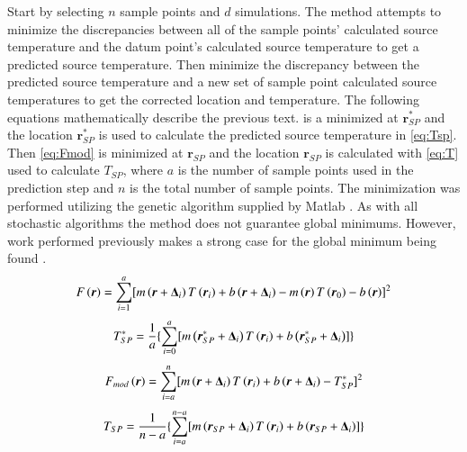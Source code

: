 \documentclass[preprint,12pt]{elsarticle}
\newcommand{\bv}[1]{\boldsymbol #1}  %
\begin{document}
Start by selecting $n$ sample points and $d$ simulations.  The method attempts to minimize the discrepancies between all of the sample points' calculated source temperature and the datum point's calculated source temperature to get a predicted source temperature.  Then minimize the discrepancy between the predicted source temperature and a new set of sample point calculated source temperatures to get the corrected location and temperature.  The following equations mathematically describe the previous text.   is a minimized at $\bv{r^{\ast}_{SP}}$ and the location $\bv{r^{\ast}_{SP}}$ is used to calculate the predicted source temperature in \cref{eq:Tsp}.  Then \cref{eq:Fmod} is minimized at $\bv{r_{SP}}$ and the location $\bv{r_{SP}}$ is calculated with \cref{eq:T} used to calculate $T_{SP}$, where $a$ is the number of sample points used in the prediction step and $n$ is the total number of sample points.  The minimization was performed utilizing the genetic algorithm supplied by Matlab \cite{matlabsoftware}.  As with all stochastic algorithms the method does not guarantee global minimums.  However, work performed previously makes a strong case for the global minimum being found \cite{ijhmt2}.
\begin{equation}
\centering
F\left( \bv r \right) =  \sum^{a}_{i=1} [ m\left( \bv r + \bv{\Delta_i}  \right) T\left( \bv{r_i} \right) +b\left( \bv r + \bv{\Delta_i} \right) -m\left( \bv r \right) T\left( \bv{r_0} \right) - b\left( \bv r \right) ]^2  
\label{eq:F}
\end{equation}
%
\begin{equation}
\centering
T^{\ast}_{SP} = \frac{1}{a} \{ \sum^{a}_{i=0} [ m\left( \bv{r^{\ast}_{SP}}+ \bv{\Delta_i}  \right) T\left( \bv{r_i} \right)  + b\left( \bv{r^{\ast}_{SP}}+ \bv{\Delta_i} \right) ] \}
\label{eq:Tsp}
\end{equation}
%
\begin{equation}
\centering
F_{mod}\left( \bv r \right) = \sum^{n}_{i=a} [ m\left( \bv r +\bv{\Delta_i} \right) T\left( \bv{r_i} \right) + b\left( \bv r + \bv{\Delta_i} \right)-T^{\ast}_{SP} ]^2
\label{eq:Fmod}
\end{equation}
%
\begin{equation}
\centering
T_{SP} = \frac{1}{n-a} \{ \sum^{n-a}_{i=a} [ m\left( \bv{r_{SP}}+ \bv{\Delta_i} \right) T\left( \bv{r_i}\right)  + b\left( \bv{r_{SP}}+ \bv{\Delta_i}  \right) ] \}
\label{eq:T}
\end{equation}
\end{document}
